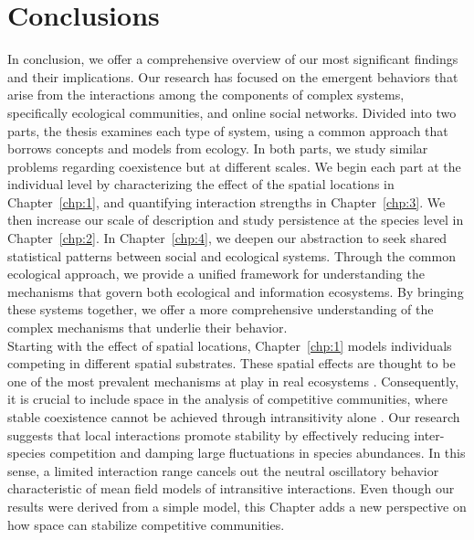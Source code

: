 \chapter{Conclusions}\label{chp:conclu}

In conclusion, we offer a comprehensive overview of our most significant findings and their implications. Our research has focused on the emergent behaviors that arise from the interactions among the components of complex systems, specifically ecological communities, and online social networks. Divided into two parts, the thesis examines each type of system, using a common approach that borrows concepts and models from ecology. In both parts, we study similar problems regarding coexistence but at different scales. We begin each part at the individual level by characterizing the effect of the spatial locations in Chapter~\ref{chp:1}, and quantifying interaction strengths in Chapter~\ref{chp:3}. We then increase our scale of description and study persistence at the species level in Chapter~\ref{chp:2}. In Chapter~\ref{chp:4}, we  deepen our abstraction to seek shared statistical patterns between social and ecological systems. Through the common ecological approach, we provide a unified framework for understanding the mechanisms that govern both ecological and information ecosystems. By bringing these systems together, we offer a more comprehensive understanding of the complex mechanisms that underlie their behavior. \\

Starting with the effect of spatial locations, Chapter~\ref{chp:1} models individuals competing in different spatial substrates. These spatial effects are thought to be one of the most prevalent mechanisms at play in real ecosystems \cite{Dieckmann2000}. Consequently, it is crucial to include space in the analysis of competitive communities, where stable coexistence cannot be achieved through intransitivity alone \cite{soliveres2018everything,godoy2017intransitivity,Grilli2017Higher-orderModels}. Our research suggests that local interactions promote stability by effectively reducing inter-species competition and damping large fluctuations in species abundances. In this sense, a limited interaction range cancels out the neutral oscillatory behavior characteristic of mean field models of intransitive interactions. Even though our results were derived from a simple model,  this Chapter adds a new perspective on how space can stabilize competitive communities. \\

